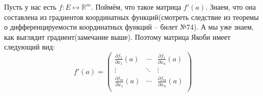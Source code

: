 \begin{remark} \thmslashn
		
		Пусть у нас есть $ f : E \mapsto \mathbb{R}^m $. Поймём, что такое матрица $ f'(a) $. Знаем, что она составлена из градиентов координатных функций(смотреть следствие из теоремы о дифференцируемости координатных функций -- билет №74). А мы уже знаем, как выглядит градиент(замечание выше). Поэтому матрица Якоби имеет следующий вид:
		\[
		f'(a) =
		\begin{pmatrix} 
		\frac{\partial f_1}{\partial x_1} (a) & \cdots & \frac{\partial f_1}{\partial x_n} (a) \\
		\vdots & \ddots & \vdots \\
		\frac{\partial f_m}{\partial x_1} (a) & \cdots & \frac{\partial f_m}{\partial x_n} (a) \\
		\end{pmatrix}
		\]
		
\end{remark}
	






